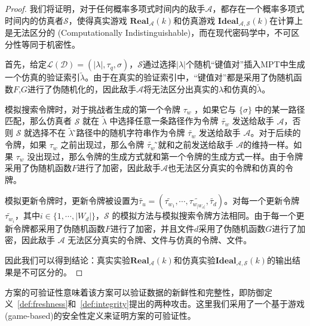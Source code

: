 \begin{proof}
  我们将证明，对于任何概率多项式时间内的敌手$\mathcal{A}$，都存在一个概率多项式时间内的仿真者$\mathcal{S}$，使得真实游戏 $\mathbf{Real}_\mathcal{A}(k)$和仿真游戏 $\mathbf{Ideal}_\mathcal{A,S}(k)$在计算上是无法区分的 (Computationally Indistinguishable)，而在现代密码学中，不可区分性等同于机密性。

  首先，给定$\mathcal{L}(\mathcal{D})=(|\lambda|,{\tau}_q,{\sigma})$，$\mathcal{S}$通过选择$|\lambda|$个随机“键值对”插入MPT中生成一个仿真的验证索引$\tilde{\lambda}$。由于在真实的验证索引中，“键值对”都是采用了伪随机函数$F$,$G$进行了伪随机化的，因此敌手$\mathcal{A}$将无法区分出真实的$\lambda$和仿真的$\tilde{\lambda}$。

  模拟搜索令牌时，对于挑战者生成的第一个令牌 $\tau_w$ ，如果它与 $\{\sigma\}$ 中的某一路径匹配，那么仿真者 $\mathcal{S}$ 就在 $\tilde{\lambda}$ 中选择任意一条路径作为令牌 $\tilde{\tau_w}$ 发送给敌手 $\mathcal{A}$，否则 $\mathcal{S}$ 就选择不在 $\tilde{\lambda}$ ̃路径中的随机字符串作为令牌 $\tilde{\tau_w}$ 发送给敌手 $\mathcal{A}$。对于后续的令牌，如果 $\tau_w$ 之前出现过，那么令牌 $\tilde{\tau_w}$ ̃就和之前发送给敌手 $\mathcal{A}$的维持一样。如果 $\tau_w$ 没出现过，那么令牌的生成方式就和第一个令牌的生成方式一样。由于令牌采用了伪随机函数$F$进行了加密，因此敌手$\mathcal{A}$也无法区分真实的令牌和仿真的令牌。

  模拟更新令牌时，更新令牌被设置为$\tilde{\tau_u} = (\tilde{\tau_{w_1}},\cdots,\tilde{\tau_{w_{|W_d|}}},\tilde{\tau_d})$。对每一个更新令牌$\tilde{\tau_{w_i}}$，其中$i \in \{1,\cdots, |W_d|\}$，$\mathcal{S}$ 的模拟方法与模拟搜索令牌方法相同。由于每一个更新令牌都采用了伪随机函数$F$进行了加密，并且文件$d$采用了伪随机函数$G$进行了加密，因此敌手 $\mathcal{A}$ 无法区分真实的令牌、文件与仿真的令牌、文件。

  因此我们可以得到结论：真实实验$\mathbf{Real}_\mathcal{A}(k)$和仿真实验$\mathbf{Ideal}_\mathcal{A,S}(k)$的输出结果是不可区分的。
\end{proof}

\single 方案的可验证性意味着该方案可以验证数据的新鲜性和完整性，即防御定义~\ref{def:freshness}和~\ref{def:integrity}提出的两种攻击。这里我们采用了一个基于游戏 (game-based)的安全性定义来证明\single 方案的可验证性。

